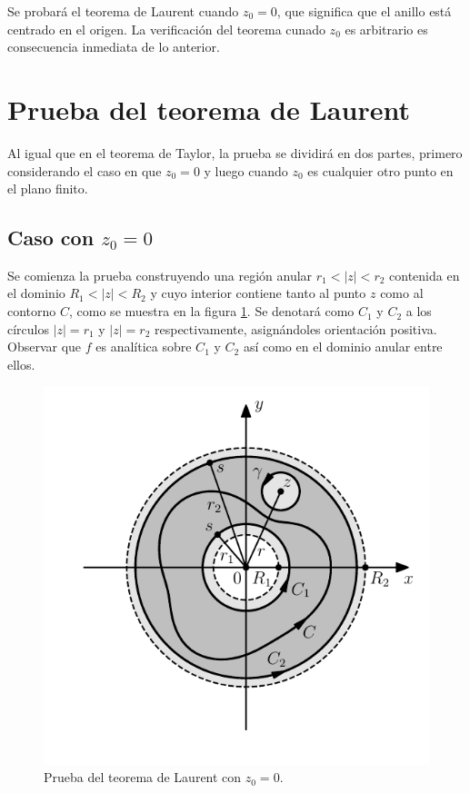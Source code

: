 \documentclass[a4paper]{report}
\begin{document}
Se probará el teorema de Laurent cuando \(z_0=0\), que significa que el anillo está centrado en el origen. La verificación del teorema cunado \(z_0\) es arbitrario es consecuencia inmediata de lo anterior.

\section{Prueba del teorema de Laurent}

Al igual que en el teorema de Taylor, la prueba se dividirá en dos partes, primero considerando el caso en que \(z_0=0\) y luego cuando \(z_0\) es cualquier otro punto en el plano finito.

\subsection*{Caso con \texorpdfstring{\(z_0=0\)}{z0=0}}

Se comienza la prueba construyendo una región anular \(r_1<|z|<r_2\) contenida en el dominio \(R_1<|z|<R_2\) y cuyo interior contiene tanto al punto \(z\) como al contorno \(C\), como se muestra en la figura \ref{fig:laurent_theorem_proof}. Se denotará como \(C_1\) y \(C_2\) a los círculos \(|z|=r_1\) y \(|z|=r_2\) respectivamente, asignándoles orientación positiva. Observar que \(f\) es analítica sobre \(C_1\) y \(C_2\) así como en el dominio anular entre ellos. 
\begin{figure}[!htb]
  \begin{minipage}[c]{0.5\textwidth}
    \includegraphics[width=\textwidth]{figuras/laurent_theorem_proof.pdf}
  \end{minipage}\hfill
  \begin{minipage}[c]{0.4\textwidth}
    \caption{
       Prueba del teorema de Laurent con \(z_0=0\).
    }\label{fig:laurent_theorem_proof}
  \end{minipage}
\end{figure}
\end{document}
